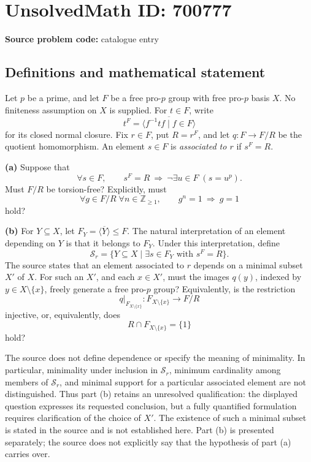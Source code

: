 \documentclass[11pt]{article}
\newcommand{\Z}{\mathbb{Z}}
\begin{document}
\section*{UnsolvedMath ID: 700777}
\textbf{Source problem code:} catalogue entry
\subsection{Definitions and mathematical statement}
Let \(p\) be a prime, and let \(F\) be a free pro-\(p\) group with free pro-\(p\) basis \(X\). No finiteness assumption on \(X\) is supplied. For \(t\in F\), write
\[
t^F=\overline{\langle f^{-1}tf\mid f\in F\rangle}
\]
for its closed normal closure. Fix \(r\in F\), put \(R=r^F\), and let \(q:F\to F/R\) be the quotient homomorphism. An element \(s\in F\) is \emph{associated to \(r\)} if \(s^F=R\).

\textbf{(a)} Suppose that
\[
\forall s\in F,\qquad s^F=R\ \Longrightarrow\ \neg\exists u\in F\;(s=u^p).
\]
Must \(F/R\) be torsion-free? Explicitly, must
\[
\forall g\in F/R\;\forall n\in\Z_{\geq 1},\qquad g^n=1\ \Longrightarrow\ g=1
\]
hold?

\textbf{(b)} For \(Y\subseteq X\), let \(F_Y=\overline{\langle Y\rangle}\leq F\). The natural interpretation of an element depending on \(Y\) is that it belongs to \(F_Y\). Under this interpretation, define
\[
\mathcal S_r=\{Y\subseteq X\mid \exists s\in F_Y\text{ with }s^F=R\}.
\]
The source states that an element associated to \(r\) depends on a minimal subset \(X'\) of \(X\). For such an \(X'\), and each \(x\in X'\), must the images \(q(y)\), indexed by \(y\in X\setminus\{x\}\), freely generate a free pro-\(p\) group? Equivalently, is the restriction
\[
q\big|_{F_{X\setminus\{x\}}}:F_{X\setminus\{x\}}\longrightarrow F/R
\]
injective, or, equivalently, does
\[
R\cap F_{X\setminus\{x\}}=\{1\}
\]
hold?

The source does not define dependence or specify the meaning of minimality. In particular, minimality under inclusion in \(\mathcal S_r\), minimum cardinality among members of \(\mathcal S_r\), and minimal support for a particular associated element are not distinguished. Thus part (b) retains an unresolved qualification: the displayed question expresses its requested conclusion, but a fully quantified formulation requires clarification of the choice of \(X'\). The existence of such a minimal subset is stated in the source and is not established here. Part (b) is presented separately; the source does not explicitly say that the hypothesis of part (a) carries over.
\end{document}
